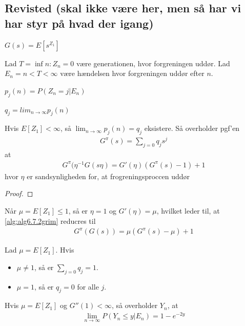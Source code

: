 \subsection{Revisted (skal ikke være her, men så har vi har styr på hvad der igang)}

$G(s)=E[s^{Z_1}]$

Lad $T=\inf{n:Z_n=0}$ være generationen, hvor forgreningen uddør. Lad $E_n={n<T<\infty}$
være hændelsen hvor forgreningen uddør efter $n$. 

$p_j(n)=P(Z_n=j | E_n)$

$q_j=lim_{n\to \infty} p_j(n)$


\begin{lem} \label{Lem:lem6.7.1grim}
Hvis $E[Z_1]<\infty$, så $\lim_{n\to \infty} p_j(n)=q_j$ eksistere. 
Så overholder pgf'en 
\begin{align*}
G^{\pi}(s)=\sum_{j=0}^{}q_j s^j 
\end{align*}
at
\begin{align} \label{alg:alg6.7.2grim}
G^{\pi}(\eta^{-1}G(s\eta)=G'(\eta)(G^{\pi}(s)-1)+1   
\end{align}
hvor $\eta$ er sandsynligheden for, at frogreningsproccen uddør
\end{lem}
\begin{proof}
\end{proof}
\begin{rem}
Når $\mu=E[Z_1] \leq 1$, så er $\eta=1$ og $G'(\eta)=\mu$, hvilket leder til, at \eqref{alg:alg6.7.2grim} reducres til 
\begin{align*}
    G^\pi(G(s))=\mu (G^\pi(s)-\mu)+1
\end{align*}
\end{rem}

\begin{cor} \label{cor:cor6.7.7grim}
Lad $\mu=E[Z_1]$. Hvis 
\begin{itemize}
    \item $\mu \neq 1$, så er $\sum_{j=0}^{}q_j=1$. 
    \item $\mu=1$, så er $q_j=0$ for alle $j$. 
\end{itemize}
\end{cor}

\begin{thm} \label{thm:thm6.7.8grim}
Hvis $\mu=E[Z_1]$ og $G''(1)<\infty$, så overholder $Y_n$, at
\begin{align*}
    \lim_{n\to\infty}P(Y_n\leq y|E_n) = 1-e^{-2y}
\end{align*}
\end{thm} 
















